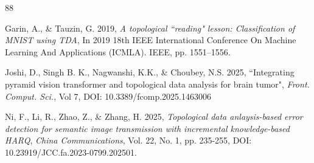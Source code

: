 \documentclass[a4paper,11pt]{article}
\theoremstyle{definition}
\begin{document}
\begin{thebibliography}{88}
 
  Garin, A., \& Tauzin, G. 2019, \emph{A topological ``reading" lesson: Classification of MNIST using TDA}, In 2019 18th IEEE International Conference On Machine Learning And Applications (ICMLA). IEEE, pp. 1551–1556.
  
 

  Joshi, D., Singh B. K., Nagwanshi, K.K., \& Choubey, N.S. 2025, ``Integrating pyramid vision transformer and topological data analysis for brain tumor", \textit{Front. Comput. Sci.}, Vol 7, DOI: 10.3389/fcomp.2025.1463006
 
 
 

 

   Ni, F., Li, R., Zhao, Z., \& Zhang, H. 2025, \textit{Topological data anlaysis-based error detection for semantic image transmission with incremental knowledge-based HARQ}, \textit{China Communications}, Vol. 22, No. 1, pp. 235-255, DOI: 10.23919/JCC.fa.2023-0799.202501.
  

\end{thebibliography}
\end{document}
